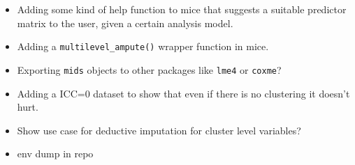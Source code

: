 \documentclass[
]{jss}
\begin{document}
\begin{itemize}
\item
  Adding some kind of help function to mice that suggests a suitable
  predictor matrix to the user, given a certain analysis model.
\item
  Adding a \texttt{multilevel\_ampute()} wrapper function in mice.
\item
  Exporting \texttt{mids} objects to other packages like \texttt{lme4}
  or \texttt{coxme}?
\item
  Adding a ICC=0 dataset to show that even if there is no clustering it
  doesn't hurt.
\item
  Show use case for deductive imputation for cluster level variables?
\item
  env dump in repo
\end{itemize}

\renewcommand\refname{References}

\end{document}
